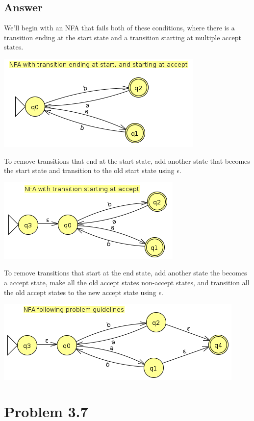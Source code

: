 \documentclass[12pt, a4paper]{article}
\begin{document}
\subsection{Answer}
We'll begin with an NFA that fails both of these conditions, where there is a transition ending at the start state and a transition starting at multiple accept states.
\begin{center}
\includegraphics[scale=0.7]{3.6a}
\end{center}
To remove transitions that end at the start state, add another state that becomes the start state and transition to the old start state using $\epsilon$.
\begin{center}
\includegraphics[scale=0.7]{3.6b}
\end{center}
To remove transitions that start at the end state, add another state the becomes a accept state, make all the old accept states non-accept states, and transition all the old accept states to the new accept state using $\epsilon$.
\begin{center}
\includegraphics[scale=0.7]{3.6c}
\end{center}

\section{Problem 3.7}
\end{document}
